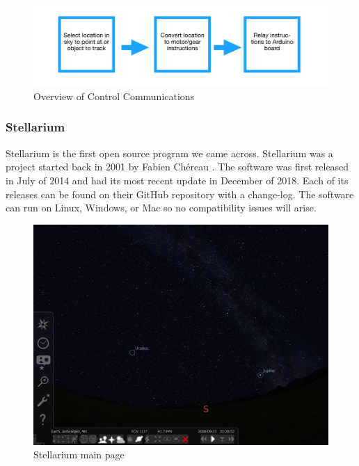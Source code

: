 \documentclass[12pt]{report}
\begin{document}
\begin{figure}[h]
	\centering
	\includegraphics[width=0.75\linewidth]{techOver}
	\caption{Overview of Control Communications}
  \label{fig:techOver}
\end{figure}

\subsubsection*{Stellarium}

Stellarium is the first open source program we came across. Stellarium was a project started back in 2001 by Fabien Chéreau \cite{stell}. The software was first released in July of 2014 and had its most recent update in December of 2018. Each of its releases can be found on their GitHub repository with a change-log. The software can run on Linux, Windows, or Mac so no compatibility issues will arise.

\begin{figure}[h]
	\centering
	\includegraphics[width=0.75\linewidth]{stell}
	\caption{Stellarium main page}
  \label{fig:stell}
\end{figure}
\end{document}
